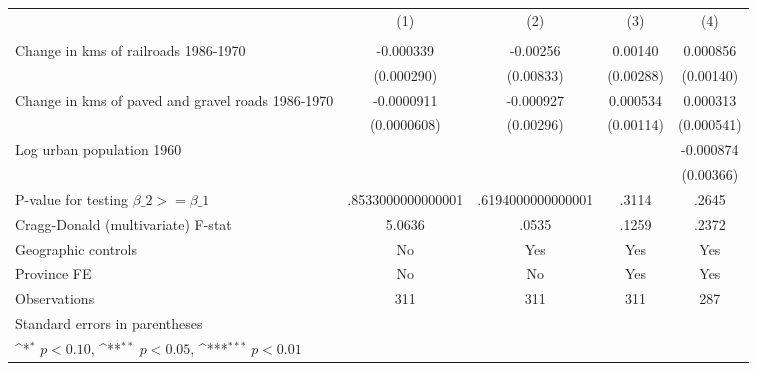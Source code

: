 {
\def\sym#1{\ifmmode^{#1}\else\(^{#1}\)\fi}
\begin{tabular}{l*{4}{c}}
\hline\hline
                &\multicolumn{1}{c}{(1)}&\multicolumn{1}{c}{(2)}&\multicolumn{1}{c}{(3)}&\multicolumn{1}{c}{(4)}\\
                &\multicolumn{1}{c}{}&\multicolumn{1}{c}{}&\multicolumn{1}{c}{}&\multicolumn{1}{c}{}\\
\hline
Change in kms of railroads 1986-1970&-0.000339         & -0.00256         &  0.00140         & 0.000856         \\
                &(0.000290)         &(0.00833)         &(0.00288)         &(0.00140)         \\
[1em]
Change in kms of paved and gravel roads 1986-1970&-0.0000911         &-0.000927         & 0.000534         & 0.000313         \\
                &(0.0000608)         &(0.00296)         &(0.00114)         &(0.000541)         \\
[1em]
Log urban population 1960&                  &                  &                  &-0.000874         \\
                &                  &                  &                  &(0.00366)         \\
\hline
P-value for testing $\beta\_{2} >= \beta\_{1}$&.8533000000000001         &.6194000000000001         &    .3114         &    .2645         \\
Cragg-Donald (multivariate) F-stat&   5.0636         &    .0535         &    .1259         &    .2372         \\
Geographic controls&       No         &      Yes         &      Yes         &      Yes         \\
Province FE     &       No         &       No         &      Yes         &      Yes         \\
Observations    &      311         &      311         &      311         &      287         \\
\hline\hline
\multicolumn{5}{l}{\footnotesize Standard errors in parentheses}\\
\multicolumn{5}{l}{\footnotesize \sym{*} \(p<0.10\), \sym{**} \(p<0.05\), \sym{***} \(p<0.01\)}\\
\end{tabular}
}
